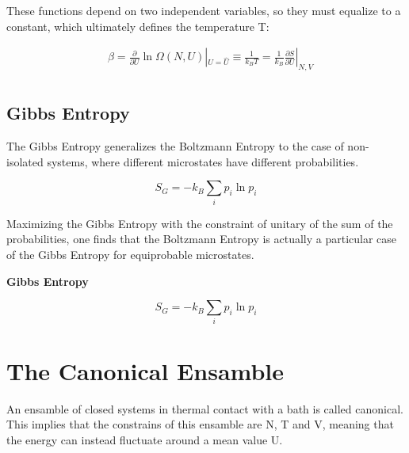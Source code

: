 \documentclass{article}
\begin{document}
These functions depend on two independent variables, so they must equalize to a constant, which ultimately defines the temperature T:

\begin{equation}
    \begin{aligned}
         & \beta=\frac{\partial}{\partial U}\ln{\Omega(N,U)}|_{U=\hat{U}} \equiv \frac{1}{k_BT}= \frac{1}{k_B}\frac{\partial S}{\partial U}|_{N,V} \\
    \end{aligned}
\end{equation}

\subsection{Gibbs Entropy}
The Gibbs Entropy generalizes the Boltzmann Entropy to the case of non-isolated systems, where different microstates have different probabilities.

\begin{equation}
    S_G=-k_B\sum_{i}p_i\ln{p_i}
\end{equation}

Maximizing the Gibbs Entropy with the constraint of unitary of the sum of the probabilities, one finds that
the Boltzmann Entropy is actually a particular case of the Gibbs Entropy for equiprobable microstates.

\newpage

\begin{tcolorbox}[colframe=gray!90, colback=gray!5, coltitle=white, sharp corners, title=\textbf{Microcanonical Ensamble, Summary}, fonttitle=\large\bfseries]
    \textbf{Gibbs Entropy}
    \vspace{0.5em}

    \begin{equation}
        S_G = -k_B \sum_{i} p_i \ln{p_i}
    \end{equation}



\end{tcolorbox}

\newpage

\section{The Canonical Ensamble}

An ensamble of closed systems in thermal contact with a bath is called canonical.
This implies that the constrains of this ensamble are N, T and V, meaning that the
energy can instead fluctuate around a mean value U.
\end{document}
